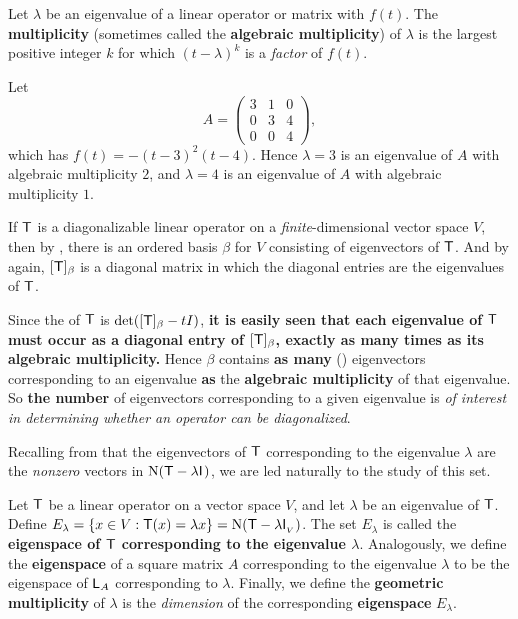 \begin{definition} \label{def 5.6}
Let \(\lambda\) be an eigenvalue of a linear operator or matrix with \CPOLY{} \(f(t)\).
The \textbf{multiplicity} (sometimes called the \textbf{algebraic multiplicity}) of \(\lambda\) is the largest positive integer \(k\) for which \((t - \lambda)^k\) is a \emph{factor} of \(f(t)\).
\end{definition}

\begin{example} \label{example 5.2.2}
Let
\[
    A = \begin{pmatrix} 3 & 1 & 0 \\ 0 & 3 & 4 \\ 0 & 0 & 4 \end{pmatrix},
\]
which has \CPOLY{} \(f(t) = -(t - 3)^2(t - 4)\).
Hence \(\lambda = 3\) is an eigenvalue of \(A\) with algebraic multiplicity \(2\), and \(\lambda = 4\) is an eigenvalue of \(A\) with algebraic multiplicity \(1\).
\end{example}

\begin{remark} \label{remark 5.2.4}
If \(\textsf{T}\) is a diagonalizable linear operator on a \emph{finite}-dimensional vector space \(V\), then by , there is an ordered basis \(\beta\) for \(V\) consisting of eigenvectors of \(\textsf{T}\).
And by  again, \([\textsf{T}]_{\beta}\) is a diagonal matrix in which the diagonal entries are the eigenvalues of \(\textsf{T}\).

Since the \CPOLY{} of \(\textsf{T}\) is \(\det([\textsf{T}]_{\beta} - tI)\), \textbf{it is easily seen that each eigenvalue of \(\textsf{T}\) must occur as a diagonal entry of \([\textsf{T}]_{\beta}\), exactly as many times as its algebraic multiplicity.}
Hence \(\beta\) contains \textbf{as many} (\LID{}) eigenvectors corresponding to an eigenvalue \textbf{as} the \textbf{algebraic multiplicity} of that eigenvalue.
So \textbf{the number} of \LID{} eigenvectors corresponding to a given eigenvalue is \emph{of interest in determining whether an operator can be diagonalized}.

Recalling from  that the eigenvectors of \(\textsf{T}\) corresponding to the eigenvalue \(\lambda\) are the \emph{nonzero} vectors in \(\mathrm{N}(\textsf{T} - \lambda \textsf{I}_{_{}})\), we are led naturally to the study of this set.
\end{remark}

\begin{definition} \label{def 5.7}
Let \(\textsf{T}\) be a linear operator on a vector space \(V\), and let \(\lambda\) be an eigenvalue of \(\textsf{T}\).
Define \(E_{\lambda} = \{x \in V : \textsf{T}(x) = \lambda x \} = \mathrm{N}(\textsf{T} - \lambda \textsf{I}_{_V}{})\).
The set \(E_{\lambda}\) is called the \textbf{eigenspace of \(\textsf{T}\) corresponding to the eigenvalue \(\lambda\)}.
Analogously, we define the \textbf{eigenspace} of a square matrix \(A\) corresponding to the eigenvalue \(\lambda\) to be the eigenspace of \(\textsf{L}_A\) corresponding to \(\lambda\).
Finally, we define the \textbf{geometric multiplicity} of \(\lambda\) is the \emph{dimension} of the corresponding \textbf{eigenspace} \(E_{\lambda}\).
\end{definition}

